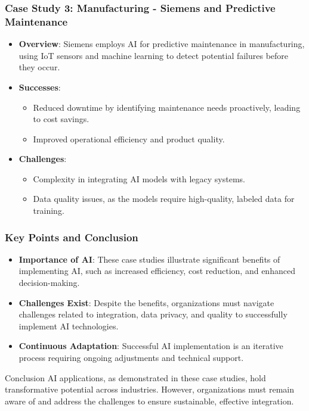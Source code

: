 \documentclass{beamer}
\begin{document}
\begin{frame}[fragile]
    \frametitle{Case Study 3: Manufacturing - Siemens and Predictive Maintenance}
    \begin{itemize}
        \item \textbf{Overview}: Siemens employs AI for predictive maintenance in manufacturing, using IoT sensors and machine learning to detect potential failures before they occur.
        \item \textbf{Successes}:
        \begin{itemize}
            \item Reduced downtime by identifying maintenance needs proactively, leading to cost savings.
            \item Improved operational efficiency and product quality.
        \end{itemize}
        \item \textbf{Challenges}:
        \begin{itemize}
            \item Complexity in integrating AI models with legacy systems.
            \item Data quality issues, as the models require high-quality, labeled data for training.
        \end{itemize}
    \end{itemize}
\end{frame}

\begin{frame}[fragile]
    \frametitle{Key Points and Conclusion}
    \begin{itemize}
        \item \textbf{Importance of AI}: These case studies illustrate significant benefits of implementing AI, such as increased efficiency, cost reduction, and enhanced decision-making.
        \item \textbf{Challenges Exist}: Despite the benefits, organizations must navigate challenges related to integration, data privacy, and quality to successfully implement AI technologies.
        \item \textbf{Continuous Adaptation}: Successful AI implementation is an iterative process requiring ongoing adjustments and technical support.
    \end{itemize}
    
    \begin{block}{Conclusion}
    AI applications, as demonstrated in these case studies, hold transformative potential across industries. However, organizations must remain aware of and address the challenges to ensure sustainable, effective integration.
    \end{block}
\end{frame}
\end{document}
